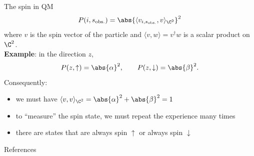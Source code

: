 \documentclass[9pt]{beamer}
\begin{document}
\begin{frame}{The spin in QM}
\begin{equation}
        P(i,s_{\text{obs.}}) = \abs{\langle v_{i,s_{\text{obs.}}},v \rangle_{\C^2}}^2
    \end{equation}
    where $v$ is the spin vector of the particle and $\langle v,w \rangle=v^\dagger w$ is a scalar product on $\C^2$.\\[0.2cm]
    \textbf{Example}: in the direction $z$,
    \begin{equation}
      P(z,\uparrow)= \abs{\alpha}^2,\qquad P(z,\downarrow)= \abs{\beta}^2.
    \end{equation}
    Consequently:
    \begin{itemize}
        \item we must have $\langle v,v\rangle_{\C^2}=\abs{\alpha}^2+\abs{\beta}^2=1$
        \item to ``measure'' the spin state, we must repeat the experience many times
        \item there are states that are always spin $\uparrow$ or always spin $\downarrow$
    \end{itemize}
\end{frame}

\begin{frame}{References}

    
    

\end{frame}
\end{document}
